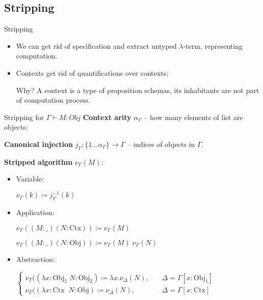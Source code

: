 \documentclass{beamer}
\begin{document}
\subsection{Stripping}


\begin{frame}{Stripping}
\begin{itemize}
\item We can get rid of specification and extract untyped $\lambda$-term, representing computation.
\item Contexts get rid of quantifications over contexts;

Why? A context is a type of proposition schemas, its inhabitants are not part of computation process.


\end{itemize}
\end{frame}
  

\begin{frame}[fragile]{Stripping for $\Gamma \vdash M : Obj$}
\textbf{Context arity} $\alpha_{\Gamma}$ -- how many elements of list are objects;

\textbf{Canonical injection} $j_{\Gamma} : \{1 \dots \alpha_{\Gamma} \} \rightarrow \Gamma$ -- indices of objects in $\Gamma$. 

\textbf{Stripped algorithm} $\nu_{\Gamma}(M)$: 

\begin{itemize}
\item Variable: 

$\nu_{\Gamma}(k) \coloneqq j_{\Gamma}^{-1}(k)$
\item Application:

$\nu_{\Gamma}( (M:\_) (N: \text{Ctx}) ) \coloneqq  \nu_{\Gamma}(M)$

$\nu_{\Gamma}( (M:\_) (N: \text{Obj}) ) \coloneqq  \nu_{\Gamma}(M)\; \nu_{\Gamma}(N)$

\item Abstraction:

$\begin{cases}
\nu_{\Gamma}( (\lambda x: \text{Obj}_1 \;  N: \text{Obj}_2 ) \coloneqq \lambda x. \nu_{\Delta}( N ) , \quad & \Delta = \Gamma [x: \text{Obj}_1] \\
\nu_{\Gamma}( (\lambda x: \text{Ctx} \; \;  N: \text{Obj} ) \coloneqq \nu_{\Delta}( N ) , \quad & \Delta = \Gamma [x: \text{Ctx}] 
\end{cases} $ 


\end{itemize}



\end{frame}
\end{document}
